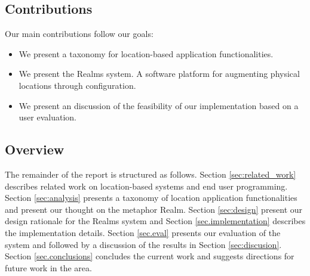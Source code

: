 \subsection{Contributions} %
\label{sub:contributions}
Our main contributions follow our goals:
\begin{itemize}
	\item We present a taxonomy for location-based application functionalities. 
	\item We present the Realms system. A software platform for augmenting physical locations through configuration.
	\item We present an discussion of the feasibility of our implementation based on a user evaluation.
\end{itemize}

\subsection{Overview} %
\label{sub:overview}
The remainder of the report is structured as follows. Section \ref{sec:related_work} describes related work on location-based systems and end user programming. Section \ref{sec:analysis} presents a taxonomy of location application functionalities and present our thought on the metaphor Realm. Section \ref{sec:design} present our design rationale for the Realms system and  Section \ref{sec.implementation} describes the implementation details. Section \ref{sec.eval} presents our evaluation of the system and followed by a discussion of the results in Section \ref{sec:discusion}. Section \ref{sec.conclusions} concludes the current work and suggests directions for future work in the area.
